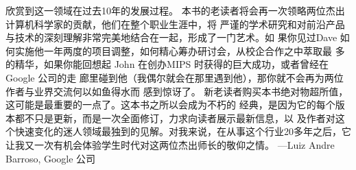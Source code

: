 欣赏到这一领域在过去10年的发展过程。
本书的老读者将会再一次领略两位杰出计算机科学家的贡献，他们在整个职业生涯中，将
严谨的学术研究和对前沿产品与技术的深刻理解非常完美地结合在一起，形成了一门艺术。如
果你见过Dave 如何实施他一年两度的项目调整，如何精心筹办研讨会，从校企合作之中萃取最
多的精华，如果你能回想起 John 在创办MIPS 时获得的巨大成功，或者曾经在Google 公司的走
廊里碰到他（我偶尔就会在那里遇到他），那你就不会再为两位作者与业界交流何以如鱼得水而
感到惊讶了。
新老读者购买本书绝对物超所值，这可能是最重要的一点了。这本书之所以会成为不朽的
经典，是因为它的每个版本都不只是更新，而是一次全面修订，力求向读者展示最新信息，以
及作者对这个快速变化的迷人领域最独到的见解。对我来说，在从事这个行业20多年之后，它
让我又一次有机会体验学生时代对这两位杰出师长的敬仰之情。
—Luiz Andre Barroso, Google 公司





